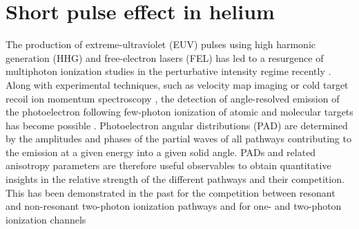 \section{Short pulse effect in helium} %
\label{sec:short_pulse_effect}
The production of extreme-ultraviolet (EUV) pulses using high harmonic generation (HHG) and free-electron lasers (FEL) has led to a resurgence of multiphoton ionization studies in the perturbative intensity regime recently \cite{nikolopoulos01,vanderhart05,shakeshaft07,pi10,florescu11,sato11,haber11,florescu12,ishikawa12,ishikawa13,ma13,rey14,grum-grzhimailo15,douget16,hofbrucker17,hofbrucker18,boll19,wang19}. Along with experimental techniques, such as velocity map imaging \cite{kornilov10,rouzee11} or cold target recoil ion momentum spectroscopy \cite{ullrich03}, the detection of angle-resolved emission of the photoelectron following few-photon ionization of atomic and molecular targets has become possible \cite{ma13}. Photoelectron angular distributions (PAD) are determined by the amplitudes and phases of the partial waves of all pathways contributing to the emission at a given energy into a given solid angle. PADs and related anisotropy parameters are therefore useful observables to obtain quantitative insights in the relative strength of the different pathways and their competition. This has been demonstrated in the past for the competition between resonant and non-resonant two-photon ionization pathways \cite{ishikawa12,ishikawa13,ma13} and for one- and two-photon ionization channels \cite{grum-grzhimailo15,douget16,boll19}

